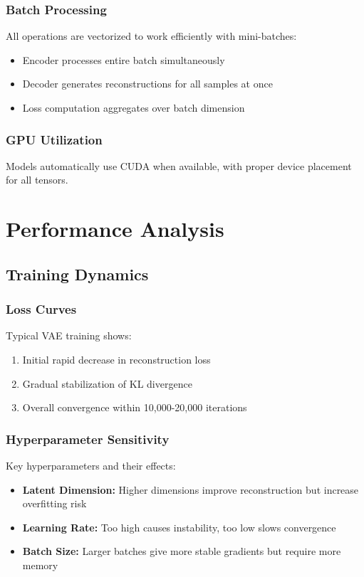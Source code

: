 \documentclass{article}
\begin{document}
\subsubsection{Batch Processing}
All operations are vectorized to work efficiently with mini-batches:

\begin{itemize}
\item Encoder processes entire batch simultaneously
\item Decoder generates reconstructions for all samples at once
\item Loss computation aggregates over batch dimension
\end{itemize}

\subsubsection{GPU Utilization}
Models automatically use CUDA when available, with proper device placement for all tensors.

\section{Performance Analysis}

\subsection{Training Dynamics}

\subsubsection{Loss Curves}
Typical VAE training shows:
\begin{enumerate}
\item Initial rapid decrease in reconstruction loss
\item Gradual stabilization of KL divergence
\item Overall convergence within 10,000-20,000 iterations
\end{enumerate}

\subsubsection{Hyperparameter Sensitivity}
Key hyperparameters and their effects:
\begin{itemize}
\item \textbf{Latent Dimension:} Higher dimensions improve reconstruction but increase overfitting risk
\item \textbf{Learning Rate:} Too high causes instability, too low slows convergence
\item \textbf{Batch Size:} Larger batches give more stable gradients but require more memory
\end{itemize}
\end{document}
